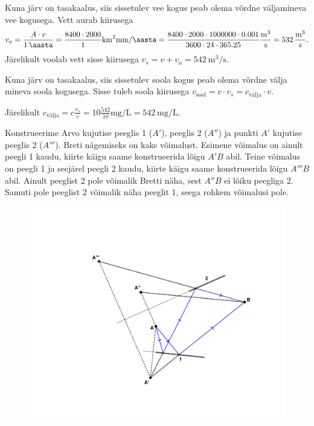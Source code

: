 \documentclass[10pt]{article}
\begin{document}

\solu
Kuna järv on tasakaalus, siis sissetulev vee kogus peab olema võrdne väljamineva vee kogusega.
Vett aurab kiirusega 
\begin{gather*}
v_a = \frac{A \cdot v} {\SI{1}{\aasta}} = \frac{8400 \cdot 2000}{1} \si{\kilo\meter\squared\milli\meter\per \aasta} =
\frac{8400 \cdot 2000 \cdot 1000000 \cdot 0.001}{3600 \cdot 24 \cdot 365.25} \si{\meter\cubed\per\second} = \SI{532}{\meter\cubed\per\second}.
\end{gather*}
Järelikult voolab vett sisse kiirusega $v_s=v + v_a = \SI{542}{\meter\cubed\per\second}$.

Kuna järv on tasakaalus, siis sissetulev soola kogus peab olema võrdne välja mineva soola kogusega. Sisse tuleb soola kiirusega $v_{\text{sool}} = c \cdot v_s  = c_{\text{välja}} \cdot v$.

Järelikult $c_{\text{välja}} = c \frac{v_s}{v} = 10 \frac{542}{10} \si{\milli\gram\per\liter} = \SI{542}{\milli\gram\per\liter}$.
\probend
\bigskip


\solu
Konstrueerime Arvo kujutise peeglis 1 ($A'$), peeglis 2 ($A''$) ja punkti $A'$ kujutise peeglis 2 ($A'''$). Breti nägemiseks on kaks võimalust. Esimene võimalus on ainult peegli 1 kaudu, kiirte käigu saame konstrueerida lõigu $A'B$ abil. Teine võimalus on peegli 1 ja seejärel peegli 2 kaudu, kiirte käigu saame konstrueerida lõigu $A'''B$ abil. Ainult peeglist 2 pole võimalik Bretti näha, sest $A''B$ ei lõiku peegliga 2. Samuti pole peeglist 2 võimalik näha peeglit 1, seega rohkem võimalusi pole.

\begin{figure}[h]
    \centering
    \includegraphics[width=\textwidth, trim=0 50 0 50, clip]{2022-v2g-01-yl.pdf}
\end{figure}
\probend
\bigskip
\end{document}

